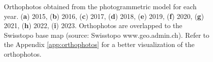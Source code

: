 \begin{figure}
{    }
    \caption{Orthophotos obtained from the photogrammetric model for each year.
        (\textbf{a}) 2015, (\textbf{b}) 2016, (\textbf{c}) 2017, (\textbf{d}) 2018,
        (\textbf{e}) 2019, (\textbf{f}) 2020, (\textbf{g}) 2021, (\textbf{h}) 2022, (\textbf{i}) 2023. Orthophotos are overlapped to the Swisstopo base map (source: Swisstopo www.geo.admin.ch). Refer to the Appendix \ref{app:orthophotos} for a better visualization of the orthophotos.}
    \label{fig:3:ortophoto}
\end{figure}

